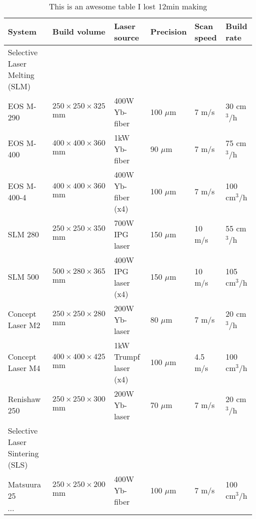 \documentclass[10pt,a4paper]{article}
\begin{document}
 \\
\begin{table}[h]
	
	\caption{ \\ This is an awesome table I lost 12min making}
	\begin{tabularx}{\textwidth}{@{}lllXXX@{}}
		\toprule
		\textbf{System} & \textbf{Build volume} & \textbf{Laser source} & \textbf{Precision} & \textbf{Scan speed} & \textbf{Build rate}\\
		\midrule
		Selective Laser Melting (SLM) & & & & & \\
		\qquad EOS M-290   & $250 \times 250 \times 325$ mm & 400W Yb-fiber 		& 100 $\mu$m & 7 m/s & 30 cm$^3$/h\\
		\qquad EOS M-400   & $400 \times 400 \times 360$ mm & 1kW Yb-fiber 			& 90 $\mu$m & 7 m/s & 75 cm$^3$/h \\
		\vspace{2mm}
		\qquad EOS M-400-4 & $400 \times 400 \times 360$ mm & 400W Yb-fiber (x4) 	& 100 $\mu$m & 7 m/s & 100 cm$^3$/h\\
		\qquad SLM 280     & $250 \times 250 \times 350$ mm & 700W IPG laser 		& 150 $\mu$m & 10 m/s & 55 cm$^3$/h\\
		\vspace{2mm}
		\qquad SLM 500     & $500 \times 280 \times 365$ mm & 400W IPG laser (x4) 	& 150 $\mu$m & 10 m/s & 105 cm$^3$/h\\
		
		\qquad Concept Laser M2 & $250 \times 250 \times 280$ mm & 200W Yb-laser 		& 80 $\mu$m & 7 m/s & 20 cm$^3$/h\\
		\vspace{2mm}
		\qquad Concept Laser M4 & $400 \times 400 \times 425$ mm & 1kW Trumpf laser (x4) 		& 100 $\mu$m & 4.5 m/s & 100 cm$^3$/h\\
		\vspace{2mm}
		\qquad Renishaw 250 & $250 \times 250 \times 300$ mm & 200W Yb-laser 		& 70 $\mu$m & 7 m/s & 20 cm$^3$/h\\
		Selective Laser Sintering (SLS) & & & & & \\
		\qquad Matsuura 25   & $250 \times 250 \times 200$ mm & 400W Yb-fiber & 100 $\mu$m & 7 m/s & 100 cm$^3$/h\\
		\qquad $\cdots$  & & & & & \\
		\bottomrule
	\end{tabularx}
\end{table}
\end{document}
